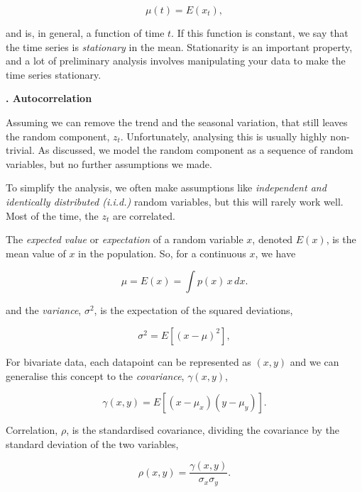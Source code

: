 \documentclass[10pt, a4paper]{article}
\newcounter{wssection}
\newcommand{\worksheetsection}[1]{
\vspace{10mm}
\stepcounter{wssection}
\noindent \Large \textbf{\thewssection. #1} \normalsize
\vspace{3mm}
}
\begin{document}
\begin{equation}
\mu(t) = E(x_t),
\end{equation}

\noindent
and is, in general, a function of time $t$. If this function is
constant, we say that the time series is \emph{stationary} in the
mean. Stationarity is an important property, and a lot of preliminary
analysis involves manipulating your data to make the time series
stationary.




\worksheetsection{Autocorrelation}

\noindent
Assuming we can remove the trend and the seasonal variation, that
still leaves the random component, $z_t$. Unfortunately, analysing
this is usually highly non-trivial. As discussed, we model the random
component as a sequence of random variables, but no further
assumptions we made.

To simplify the analysis, we often make assumptions like
\emph{independent and identically distributed (i.i.d.)} random
variables, but this will rarely work well. Most of the time, the $z_t$
are correlated.

The \emph{expected value} or \emph{expectation} of a random variable
$x$, denoted $E(x)$, is the mean value of $x$ in the population. So,
for a continuous $x$, we have

\begin{equation}
\mu = E(x) = \int p(x) \, x \, dx.
\end{equation}

\noindent
and the \emph{variance}, $\sigma^2$, is the expectation of the squared
deviations,

\begin{equation}
\sigma^2 = E[(x - \mu)^2],
\end{equation}

For bivariate data, each datapoint can be represented as $(x, y)$ and
we can generalise this concept to the \emph{covariance},
$\gamma(x, y)$,

\begin{equation}
\gamma(x, y) = E[(x - \mu_x)(y - \mu_y)].
\end{equation}

\noindent
Correlation, $\rho$, is the standardised covariance, dividing the
covariance by the standard deviation of the two variables,

\begin{equation}
\rho(x, y) = \frac{\gamma(x, y)}{\sigma_x \sigma_y}.
\end{equation}
\end{document}
